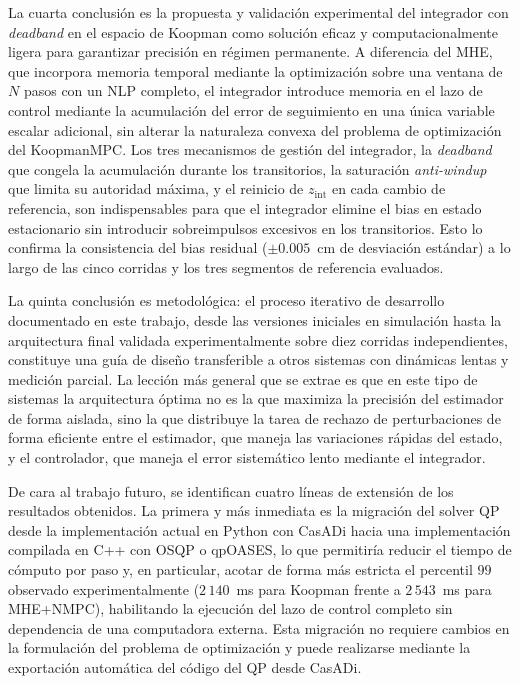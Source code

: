 \documentclass[12pt,letterpaper]{article}
\begin{document}
La cuarta conclusión es la propuesta y validación experimental 
del integrador con \textit{deadband} en el espacio de Koopman 
como solución eficaz y computacionalmente ligera para garantizar 
precisión en régimen permanente. A diferencia del MHE, que 
incorpora memoria temporal mediante la optimización sobre una 
ventana de $N$ pasos con un NLP completo, el integrador introduce 
memoria en el lazo de control mediante la acumulación del error 
de seguimiento en una única variable escalar adicional, sin 
alterar la naturaleza convexa del problema de optimización del 
KoopmanMPC. Los tres mecanismos de gestión del integrador,
la \textit{deadband} que congela la acumulación durante los
transitorios, la saturación \textit{anti-windup} que limita su
autoridad máxima, y el reinicio de $z_{\mathrm{int}}$ en cada
cambio de referencia, son indispensables para que el integrador
elimine el bias en estado estacionario sin introducir
sobreimpulsos excesivos en los transitorios. Esto lo confirma la
consistencia del bias residual ($\pm 0.005$~cm de desviación
estándar) a lo largo de las cinco corridas y los tres segmentos
de referencia evaluados.

La quinta conclusión es metodológica: el proceso iterativo de
desarrollo documentado en este trabajo, desde las versiones
iniciales en simulación hasta la arquitectura final validada
experimentalmente sobre diez corridas independientes,
constituye una guía de diseño transferible a otros sistemas con
dinámicas lentas y medición parcial. La lección más general que
se extrae es que en este tipo de sistemas la arquitectura óptima
no es la que maximiza la precisión del estimador de forma
aislada, sino la que distribuye la tarea de rechazo de
perturbaciones de forma eficiente entre el estimador, que
maneja las variaciones rápidas del estado, y el controlador,
que maneja el error sistemático lento mediante el
integrador.

De cara al trabajo futuro, se identifican cuatro líneas de 
extensión de los resultados obtenidos. La primera y más 
inmediata es la migración del solver QP desde la implementación 
actual en Python con CasADi hacia una implementación compilada 
en C++ con OSQP o qpOASES, lo que permitiría reducir el tiempo 
de cómputo por paso y, en particular, acotar de forma más 
estricta el percentil $99$ observado experimentalmente 
($2\,140$~ms para Koopman frente a $2\,543$~ms para MHE+NMPC), 
habilitando la ejecución del lazo de control completo sin 
dependencia de una computadora externa. Esta migración no 
requiere cambios en la formulación del problema de optimización 
y puede realizarse mediante la exportación automática del código 
del QP desde CasADi.
\end{document}
